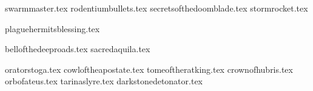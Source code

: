 
\raggedcolumns
\begin{multicols}{2}

\subtitle{\weaponenchantments}
\startsortedpricelist

{swarmmaster.tex}
{rodentiumbullets.tex}
{secretsofthedoomblade.tex}
{stormrocket.tex}

\endsortedpricelist

\subtitle{\armourenchantments}
\startsortedpricelist

{plaguehermitsblessing.tex}

\endsortedpricelist

\subtitle{\bannerenchantments}
\startsortedpricelist

{bellofthedeeproads.tex}
{sacredaquila.tex}

\endsortedpricelist

\newpage
\subtitle{\artefacts}
\startsortedpricelistNSP

{oratorstoga.tex}
{cowloftheapostate.tex}
{tomeoftheratking.tex}
{crownofhubris.tex}
{orbofateus.tex}
{tarinaslyre.tex}
{darkstonedetonator.tex}

\endsortedpricelistNSP
\end{multicols}
